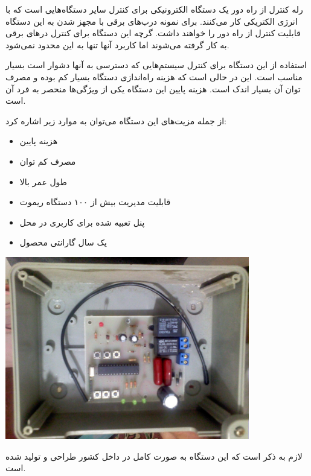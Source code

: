 % 
% 
% 
% 
% 
% 

رله کنترل از راه دور یک دستگاه الکترونیکی برای کنترل سایر دستگاه‌هایی است که با
انرژی الکتریکی کار می‌کنند.
برای نمونه درب‌های برقی با مجهز شدن به این دستگاه قابلیت کنترل از راه دور را
خواهند داشت.
گرچه این دستگاه برای کنترل درهای برقی به کار گرفته می‌شوند اما کاربرد آنها تنها
به این محدود نمی‌شود.

استفاده از این دستگاه برای کنترل سیستم‌هایی که دسترسی به آنها دشوار است بسیار
مناسب است.
این در حالی است که هزینه راه‌اندازی دستگاه بسیار کم بوده و مصرف توان آن بسیار
اندک است.
هزینه پایین این دستگاه یکی از ویژگی‌ها منحصر به فرد آن است.

از جمله مزیت‌های این دستگاه می‌توان به موارد زیر اشاره کرد:
\begin{itemize}
  \item هزینه پایین
  \item مصرف کم توان
  \item طول عمر بالا
  \item قابلیت مدیریت بیش از ۱۰۰ دستگاه ریموت
  \item پنل تعبیه شده برای کاربری در محل
  \item یک سال گارانتی محصول
\end{itemize}

\includegraphics[width=0.8\textwidth]{image/view}

لازم به ذکر است که این دستگاه به صورت کامل در داخل کشور طراحی و تولید شده است.

